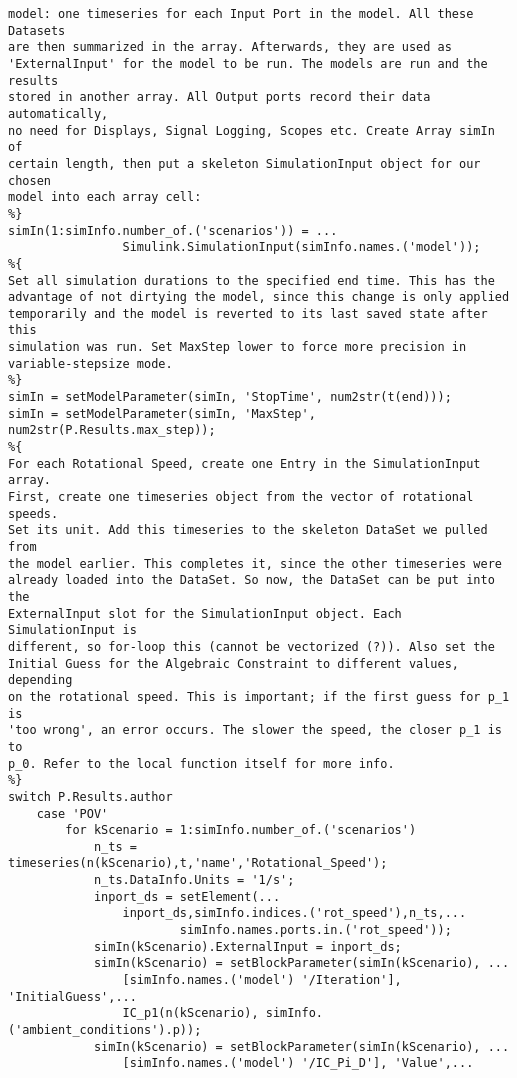 \begin{lstlisting}
model: one timeseries for each Input Port in the model. All these Datasets
are then summarized in the array. Afterwards, they are used as
'ExternalInput' for the model to be run. The models are run and the results
stored in another array. All Output ports record their data automatically,
no need for Displays, Signal Logging, Scopes etc. Create Array simIn of
certain length, then put a skeleton SimulationInput object for our chosen
model into each array cell:
%}
simIn(1:simInfo.number_of.('scenarios')) = ...
                Simulink.SimulationInput(simInfo.names.('model'));
%{
Set all simulation durations to the specified end time. This has the
advantage of not dirtying the model, since this change is only applied
temporarily and the model is reverted to its last saved state after this
simulation was run. Set MaxStep lower to force more precision in
variable-stepsize mode.
%}
simIn = setModelParameter(simIn, 'StopTime', num2str(t(end)));
simIn = setModelParameter(simIn, 'MaxStep', num2str(P.Results.max_step));
%{
For each Rotational Speed, create one Entry in the SimulationInput array.
First, create one timeseries object from the vector of rotational speeds.
Set its unit. Add this timeseries to the skeleton DataSet we pulled from
the model earlier. This completes it, since the other timeseries were
already loaded into the DataSet. So now, the DataSet can be put into the
ExternalInput slot for the SimulationInput object. Each SimulationInput is
different, so for-loop this (cannot be vectorized (?)). Also set the
Initial Guess for the Algebraic Constraint to different values, depending
on the rotational speed. This is important; if the first guess for p_1 is
'too wrong', an error occurs. The slower the speed, the closer p_1 is to
p_0. Refer to the local function itself for more info.
%}
switch P.Results.author
    case 'POV'
        for kScenario = 1:simInfo.number_of.('scenarios')
            n_ts = timeseries(n(kScenario),t,'name','Rotational_Speed');
            n_ts.DataInfo.Units = '1/s';
            inport_ds = setElement(...
                inport_ds,simInfo.indices.('rot_speed'),n_ts,...
                        simInfo.names.ports.in.('rot_speed'));
            simIn(kScenario).ExternalInput = inport_ds;
            simIn(kScenario) = setBlockParameter(simIn(kScenario), ...
                [simInfo.names.('model') '/Iteration'], 'InitialGuess',...
                IC_p1(n(kScenario), simInfo.('ambient_conditions').p));
            simIn(kScenario) = setBlockParameter(simIn(kScenario), ...
                [simInfo.names.('model') '/IC_Pi_D'], 'Value',...

\end{lstlisting}
